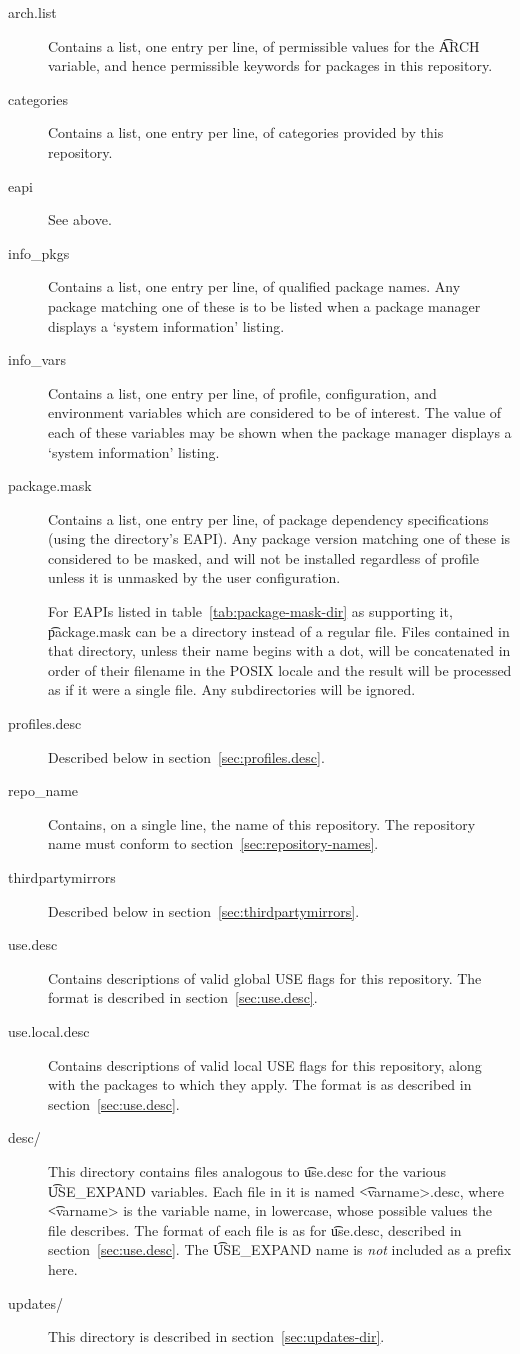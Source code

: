 \begin{description}
\item[arch.list] Contains a list, one entry per line, of permissible values for the \t{ARCH}
    variable, and hence permissible keywords for packages in this repository.
\item[categories] Contains a list, one entry per line, of categories provided by this repository.
\item[eapi] See above.
\item[info_pkgs] Contains a list, one entry per line, of qualified package names. Any package
    matching one of these is to be listed when a package manager displays a `system information'
    listing.
\item[info_vars] Contains a list, one entry per line, of profile, configuration, and environment
    variables which are considered to be of interest. The value of each of these variables may be
    shown when the package manager displays a `system information' listing.
\item[package.mask]
    Contains a list, one entry per line, of package dependency specifications (using the directory's
    EAPI). Any package version matching one of these is considered to be masked, and will not be
    installed regardless of profile unless it is unmasked by the user configuration.

     For EAPIs listed in table~\ref{tab:package-mask-dir} as
    supporting it, \t{package.mask} can be a directory instead of a regular file. Files contained
    in that directory, unless their name begins with a dot, will be concatenated in order of their
    filename in the POSIX locale and the result will be processed as if it were a single file.
    Any subdirectories will be ignored.
\item[profiles.desc] Described below in section~\ref{sec:profiles.desc}.
\item[repo_name] Contains, on a single line, the name of this repository. The repository name must
    conform to section~\ref{sec:repository-names}.
\item[thirdpartymirrors] Described below in section~\ref{sec:thirdpartymirrors}.
\item[use.desc] Contains descriptions of valid global USE flags for this repository. The format is
    described in section~\ref{sec:use.desc}.
\item[use.local.desc] Contains descriptions of valid local USE flags for this repository, along with
    the packages to which they apply. The format is as described in section~\ref{sec:use.desc}.
\item[desc/] This directory contains files analogous to \t{use.desc} for the various \t{USE_EXPAND}
    variables. Each file in it is named \t{<varname>.desc}, where \t{<varname>} is the variable
    name, in lowercase, whose possible values the file describes. The format of each file is as for
    \t{use.desc}, described in section~\ref{sec:use.desc}. The \t{USE_EXPAND} name is \emph{not}
    included as a prefix here.
\item[updates/] This directory is described in section~\ref{sec:updates-dir}.
\end{description}

